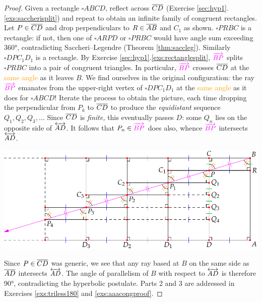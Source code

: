 \begin{proof}
	Given a rectangle $\square ABCD$, reflect across $\overline{CD}$ (Exercise \ref*{sec:hyp1}.\ref{exs:saccherisplit}) and repeat to obtain an infinite family of congruent rectangles. Let $P\in\overline{CD}$ and drop perpendiculars to $R\in\overline{AB}$ and $C_1$ as shown.\smallbreak
	$\square PRBC$ is a rectangle: if not, then one of $\square ARPD$ or $\square PRBC$ would have angle sum exceeding \ang{360}, contradicting Saccheri--Legendre (Theorem \ref{thm:saccleg}). Similarly $\square DPC_1D_1$ is a rectangle.\smallbreak
	By Exercise \ref*{sec:hyp1}.\ref{exs:rectanglesplit}, $\textcolor{Magenta}{\ray{BP}}$ splits $\square PRBC$ into a pair of congruent triangles. In particular, $\textcolor{Magenta}{\ray{BP}}$ crosses $\overline{CD}$ at the \textcolor{orange}{same angle} as it leaves $B$. We find ourselves in the original configuration: the ray $\textcolor{Magenta}{\ray{BP}}$ emanates from the upper-right vertex of $\square DPC_1D_1$ at the \textcolor{orange}{same angle} as it does for $\square ABCD$!\smallbreak
	Iterate the process to obtain the picture, each time dropping the perpendicular from $P_k$ to $\overline{CD}$ to produce the \emph{equidistant} sequence $Q_1,Q_2,Q_3,\ldots$ Since $\overline{CD}$ is \emph{finite,} this eventually\footnotemark{} passes $D$: some $Q_n$ lies on the opposite side of $\overleftrightarrow{AD}$. It follows that $P_n\in\textcolor{Magenta}{\ray{BP}}$ does also, whence $\textcolor{Magenta}{\ray{BP}}$ intersects $\overleftrightarrow{AD}$.
	\begin{center}
		\includegraphics[scale=0.95]{basic-rect4}\vspace{-4pt}
	\end{center}
	Since $P\in\overline{CD}$ was generic, we see that any ray based at $B$ on the same side as $\overline{AD}$ intersects $\overleftrightarrow{AD}$. The angle of parallelism of $B$ with respect to $\overleftrightarrow{AD}$ is therefore \ang{90}, contradicting the hyperbolic postulate.\smallbreak
	Parts 2 and 3 are addressed in Exercises \ref{exs:triless180} and \ref{exs:aaacongproof}.
\end{proof}

